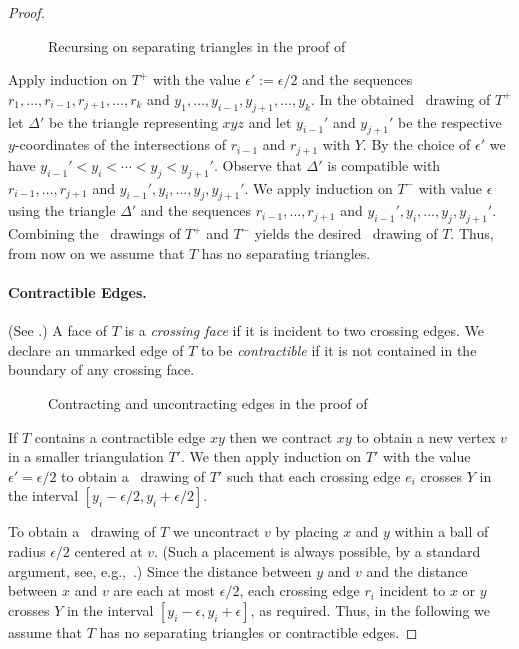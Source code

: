 \begin{proof}
	\begin{figure}
		\caption{Recursing on separating triangles in the proof of
			}
\end{figure}
	
Apply induction on $T^+$ with the value $\epsilon':=\epsilon/2$ and the sequences $r_1,\ldots,r_{i-1},r_{j+1},\ldots,r_k$ and
	$y_1,\ldots,y_{i-1},y_{j+1},\ldots,y_k$. In the obtained \Fary\ drawing of $T^+$ let $\Delta'$ be the triangle representing  $xyz$ and let $y_{i-1}'$ and $y_{j+1}'$
	be the respective $y$-coordinates of the intersections of
	$r_{i-1}$ and $r_{j+1}$ with $Y$.  By the choice of
	$\epsilon'$ we have $y_{i-1}'<y_i<\cdots<y_j<y_{j+1}'$.  Observe that
	$\Delta'$ is compatible with $r_{i-1},\ldots,r_{j+1}$ and
	$y_{i-1}',y_i,\ldots,y_j,y_{j+1}'$.
	We apply induction on $T^-$ with value $\epsilon$ using the triangle $\Delta'$ and the sequences $r_{i-1},\ldots,r_{j+1}$ and
	$y_{i-1}',y_i,\ldots,y_{j},y_{j+1}'$.  Combining the \Fary\ drawings of $T^+$
	and $T^-$ yields the desired \Fary\ drawing of $T$.  Thus,
        from now on we assume that $T$ has no separating triangles.
	
	\paragraph{Contractible Edges.}
	(See .)
	A face of $T$ is a \emph{crossing
		face} if it is incident to two crossing edges. We declare an
	unmarked edge of $T$ to be \emph{contractible} if it is not contained
	in the boundary of any crossing face.  
	\begin{figure}
		\caption{Contracting and uncontracting edges in the proof of
			}
	\end{figure}
	
	If $T$ contains a contractible edge $xy$ then we contract $xy$ to
	obtain a new vertex $v$ in a smaller triangulation $T'$.   We then apply
	induction on $T'$ with the value $\epsilon'=\epsilon/2$ to obtain a \Fary\
	drawing of $T'$ such that each crossing edge $e_i$ crosses
	$Y$ in the interval $[y_i-\epsilon/2,y_i+\epsilon/2]$.
	
	To obtain a \Fary\ drawing of $T$ we uncontract $v$ by placing $x$ and $y$
	within a ball of radius $\epsilon/2$ centered at $v$. (Such
	a placement is always possible, by a standard argument, see, e.g.,~\cite{fary,w-sp-05}.)  Since the
	distance between $y$ and $v$ and the distance between $x$ and $v$ are each at most $\epsilon/2$,
	each crossing edge $r_i$ incident to $x$ or $y$ crosses $Y$ in the interval $[y_i-\epsilon,y_i+\epsilon]$, as required.
	Thus, in the following we assume that $T$ has no separating triangles or contractible
	edges.
	

\end{proof}
